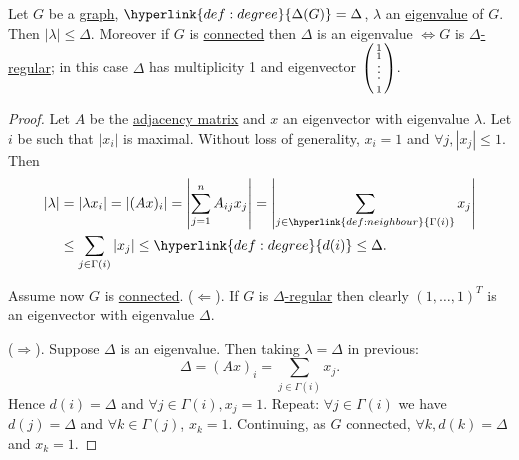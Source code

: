 \documentclass{article}
\begin{document}
\begin{nthm}\label{thm:46}
    Let $G$ be a \hyperlink{def:graph}{graph}, $\hyperlink{def:degree}{\Delta(G)} = \Delta$, $\lambda$ an \hyperlink{def:eigen}{eigenvalue} of $G$.
    Then $|\lambda| \leq \Delta$.
    Moreover if $G$ is \hyperlink{def:components}{connected} then $\Delta$ is an eigenvalue $\iff G$ is \hyperlink{def:regular}{$\Delta$-regular}; in this case $\Delta$ has multiplicity 1 and eigenvector $\left(\begin{smallmatrix}1\\1\\  \vphantom{\int\limits^x}\smash{\vdots}\\1\end{smallmatrix}\right)$.
\end{nthm}
\begin{proof}
    Let $A$ be the \hyperlink{def:adj}{adjacency matrix} and $x$ an eigenvector with eigenvalue $\lambda$.
    Let $i$ be such that $|x_i|$ is maximal. Without loss of generality, $x_i = 1$ and $\forall j, |x_j| \leq 1$.
    Then
    \begin{align*}
        |\lambda| &= |\lambda x_i| = |(A x)_i| = \left|\sum_{j=1}^n A_{ij} x_j\right| = \left|\sum_{j \in \hyperlink{def:neighbour}{\Gamma(i)}} x_j\right| \\
                  &\leq \sum_{j \in \Gamma(i)} |x_j| \leq \hyperlink{def:degree}{d(i)} \leq \Delta.
    \end{align*}

    Assume now $G$ is \hyperlink{def:components}{connected}.
    ($\Leftarrow$). If $G$ is \hyperlink{def:regular}{$\Delta$-regular} then clearly $(1,\dotsc,1)^T$ is an eigenvector with eigenvalue $\Delta$.

    ($\Rightarrow$). Suppose $\Delta$ is an eigenvalue. Then taking $\lambda = \Delta$ in previous:
    \begin{equation*}
        \Delta = (Ax)_i = \sum_{j \in \Gamma(i)} x_j.
    \end{equation*}
    Hence $d(i) = \Delta$ and $\forall j \in \Gamma(i), x_j=1$.
    Repeat: $\forall j \in \Gamma(i)$ we have $d(j) = \Delta$ and $\forall k \in \Gamma(j)$, $x_k = 1$.
    Continuing, as $G$ connected, $\forall k, d(k) = \Delta$ and $x_k = 1$.
\end{proof}
\end{document}
